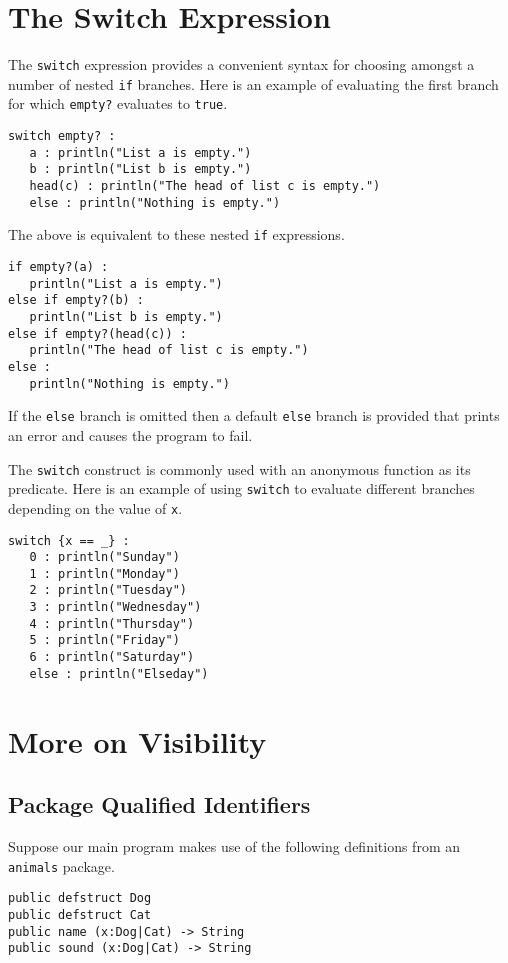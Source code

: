 \documentclass[10pt,oneside]{book}
\begin{document}
\section{The Switch Expression}
The \texttt{\frenchspacing switch} expression provides a convenient syntax for choosing amongst a number of nested \texttt{\frenchspacing if} branches. Here is an example of evaluating the first branch for which \texttt{\frenchspacing empty?} evaluates to \texttt{\frenchspacing true}.
\begin{lstlisting}
switch empty? :
   a : println("List a is empty.")
   b : println("List b is empty.")
   head(c) : println("The head of list c is empty.")
   else : println("Nothing is empty.")
\end{lstlisting}
The above is equivalent to these nested \texttt{\frenchspacing if} expressions.
\begin{lstlisting}
if empty?(a) :
   println("List a is empty.")
else if empty?(b) :
   println("List b is empty.")
else if empty?(head(c)) :
   println("The head of list c is empty.")
else :
   println("Nothing is empty.")
\end{lstlisting}
If the \texttt{\frenchspacing else} branch is omitted then a default \texttt{\frenchspacing else} branch is provided that prints an error and causes the program to fail. 

The \texttt{\frenchspacing switch} construct is commonly used with an anonymous function as its predicate. Here is an example of using \texttt{\frenchspacing switch} to evaluate different branches depending on the value of \texttt{\frenchspacing x}.
\begin{lstlisting}
switch {x == _} :
   0 : println("Sunday")
   1 : println("Monday")
   2 : println("Tuesday")
   3 : println("Wednesday")
   4 : println("Thursday")
   5 : println("Friday")
   6 : println("Saturday")
   else : println("Elseday")
\end{lstlisting}

\section{More on Visibility}
\subsection*{Package Qualified Identifiers}
Suppose our main program makes use of the following definitions from an \texttt{\frenchspacing animals} package.
\begin{lstlisting}
public defstruct Dog
public defstruct Cat
public name (x:Dog|Cat) -> String
public sound (x:Dog|Cat) -> String
\end{lstlisting}
\end{document}
